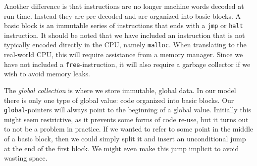 Another difference is that instructions are no longer machine words decoded at
run-time. Instead they are pre-decoded and are organized into basic blocks. A
basic block is an immutable series of instructions that ends with a \texttt{jmp}
or \texttt{halt} instruction. It should be noted that we have included an
instruction that is not typically encoded directly in the CPU, namely
\texttt{malloc}. When translating to the real-world CPU, this will require
assistance from a memory manager. Since we have not included a
\texttt{free}-instruction, it will also require a garbage collector if we wish
to avoid memory leaks.

The \emph{global collection} is where we store immutable, global data. In our
model there is only one type of global value: code organized into basic
blocks. Our \texttt{global}-pointers will always point to the beginning of a
global value. Initially this might seem restrictive, as it prevents some forms
of code re-use, but it turns out to not be a problem in practice. If we wanted
to refer to some point in the middle of a basic block, then we could simply
split it and insert an unconditional jump at the end of the first block. We
might even make this jump implicit to avoid wasting space.

